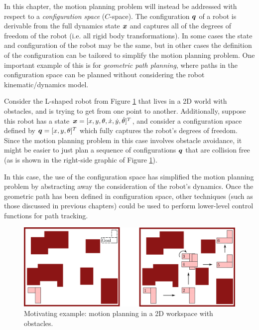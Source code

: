 In this chapter, the motion planning problem will instead be addressed with respect to a \textit{configuration space} ($C$-space).
The configuration $\bm{q}$ of a robot is derivable from the full dynamics state $\bm{x}$ and captures all of the degrees of freedom of the robot (i.e. all rigid body transformations). In some cases the state and configuration of the robot may be the same, but in other cases the definition of the configuration can be tailored to simplify the motion planning problem. One important example of this is for \textit{geometric path planning}, where paths in the configuration space can be planned without considering the robot kinematic/dynamics model.

\begin{example} \label{ex:mot}
\theoremstyle{definition}
Consider the L-shaped robot from Figure \ref{fig:2dworkspace} that lives in a 2D world with obstacles, and is trying to get from one point to another. Additionally, suppose this robot has a state $\bm{x} = [x,y,\theta,\dot{x}, \dot{y}, \dot{\theta}]^T$, and consider a configuration space defined by $\bm{q} = [x,y,\theta]^T$ which fully captures the robot's degrees of freedom. Since the motion planning problem in this case involves obstacle avoidance, it might be easier to just plan a sequence of configurations $\bm{q}$ that are collision free (as is shown in the right-side graphic of Figure \ref{fig:2dworkspace}).

In this case, the use of the configuration space has simplified the motion planning problem by abstracting away the consideration of the robot's dynamics. Once the geometric path has been defined in configuration space, other techniques (such as those discussed in previous chapters) could be used to perform lower-level control functions for path tracking.
\begin{figure}[ht] 
    \centering 
    \includegraphics[width=0.85\linewidth]{tex/figs/ch06_figs/2d_ws_obstacles.png}
    \caption{Motivating example: motion planning in a 2D workspace with obstacles.}
    \label{fig:2dworkspace} 
\end{figure}


\end{example}
